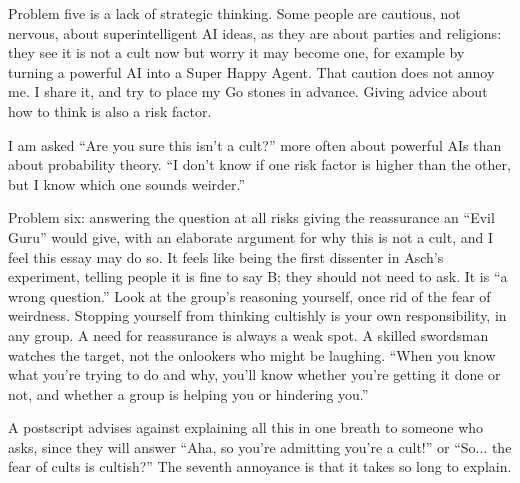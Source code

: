 Problem five is a lack of strategic thinking. Some people are cautious, not nervous, about superintelligent AI ideas, as they are about parties and religions: they see it is not a cult now but worry it may become one, for example by turning a powerful AI into a Super Happy Agent. That caution does not annoy me. I share it, and try to place my Go stones in advance. Giving advice about how to think is also a risk factor.

I am asked ``Are you sure this isn't a cult?'' more often about powerful AIs than about probability theory. ``I don't know if one risk factor is higher than the other, but I know which one sounds weirder.'' 

Problem six: answering the question at all risks giving the reassurance an ``Evil Guru'' would give, with an elaborate argument for why this is not a cult, and I feel this essay may do so. It feels like being the first dissenter in Asch's experiment, telling people it is fine to say B; they should not need to ask. It is ``a wrong question.'' Look at the group's reasoning yourself, once rid of the fear of weirdness. Stopping yourself from thinking cultishly is your own responsibility, in any group. A need for reassurance is always a weak spot. A skilled swordsman watches the target, not the onlookers who might be laughing. ``When you know what you're trying to do and why, you'll know whether you're getting it done or not, and whether a group is helping you or hindering you.'' 

A postscript advises against explaining all this in one breath to someone who asks, since they will answer ``Aha, so you're admitting you're a cult!'' or ``So... the fear of cults is cultish?'' The seventh annoyance is that it takes so long to explain.
